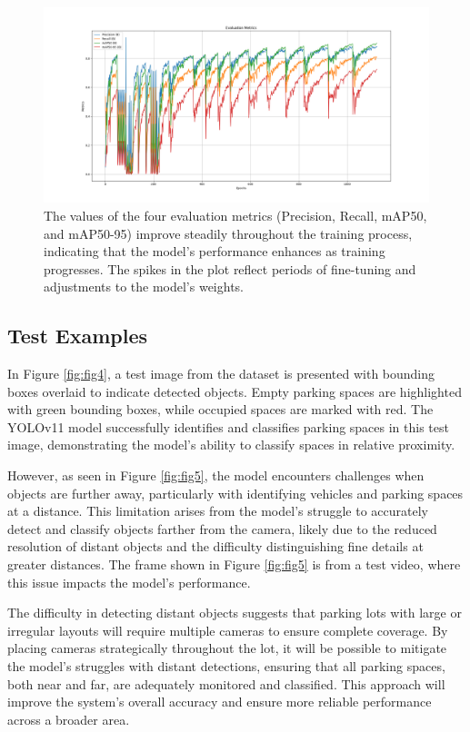\documentclass[conference]{IEEEtran}
\begin{document}
\begin{figure}[h]
    \centering
    \includegraphics[scale=0.2]{Figure_3.png}
    \caption{
        The values of the four evaluation metrics 
        (Precision, Recall, mAP50, and mAP50-95) 
        improve steadily throughout the training process, 
        indicating that the model's performance enhances as training progresses. 
        The spikes in the plot reflect periods of fine-tuning and adjustments to the model’s weights.   
    }
    \label{fig:fig3}
\end{figure}


\subsection{Test Examples}

In Figure \ref{fig:fig4}, 
a test image from the dataset is presented with bounding boxes overlaid to indicate detected objects. 
Empty parking spaces are highlighted with green bounding boxes, 
while occupied spaces are marked with red. 
The YOLOv11 model successfully identifies and classifies parking spaces in this test image, 
demonstrating the model's ability to classify spaces in relative proximity.

However, 
as seen in Figure \ref{fig:fig5}, 
the model encounters challenges when objects are further away, 
particularly with identifying vehicles and parking spaces at a distance. 
This limitation arises from the model's struggle to accurately detect and classify objects farther from the camera, 
likely due to the reduced resolution of distant objects and the difficulty distinguishing fine details at greater distances. 
The frame shown in Figure \ref{fig:fig5} is from a test video, 
where this issue impacts the model’s performance.

The difficulty in detecting distant objects suggests that parking lots with large or irregular layouts will require multiple cameras to ensure complete coverage. 
By placing cameras strategically throughout the lot, 
it will be possible to mitigate the model's struggles with distant detections, 
ensuring that all parking spaces, 
both near and far, 
are adequately monitored and classified. 
This approach will improve the system's overall accuracy and ensure more reliable performance across a broader area.
\end{document}
